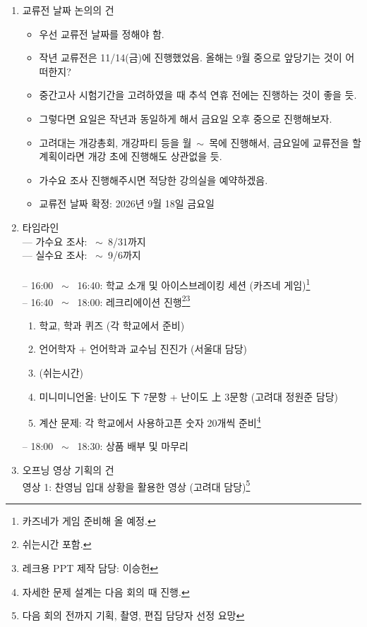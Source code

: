 \documentclass{oblivoir}
\begin{document}
\begin{enumerate}
    \item 교류전 날짜 논의의 건
    \begin{itemize}
        \item [승헌] 우선 교류전 날짜를 정해야 함.
        \item [찬영] 작년 교류전은 11/14(금)에 진행했었음. 올해는 9월 중으로 앞당기는 것이 어떠한지?
        \item [원준] 중간고사 시험기간을 고려하였을 때 추석 연휴 전에는 진행하는 것이 좋을 듯.
        \item [승헌] 그렇다면 요일은 작년과 동일하게 해서 금요일 오후 중으로 진행해보자. 
        \item [세찬] 고려대는 개강총회, 개강파티 등을 월~$\sim$~목에 진행해서, 금요일에 교류전을 할 계획이라면 개강 초에 진행해도 상관없을 듯.
        \item [승헌] 가수요 조사 진행해주시면 적당한 강의실을 예약하겠음.
        \item 교류전 날짜 확정: 2026년 9월 18일 금요일
    \end{itemize}
    \item 타임라인
    \\--- 가수요 조사: ~$\sim$~8/31까지
    \\--- 실수요 조사: ~$\sim$~9/6까지
    \\[교류전 타임라인]
    \\-- 16:00 ~$\sim$~ 16:40: 학교 소개 및 아이스브레이킹 세션 (카즈네 게임)\footnote{카즈네가 게임 준비해 올 예정.}
    \\-- 16:40 ~$\sim$~ 18:00: 레크리에이션 진행\footnote{쉬는시간 포함.}\footnote{레크용 PPT 제작 담당: 이승헌}
    \begin{enumerate}
        \item 학교, 학과 퀴즈 (각 학교에서 준비)
        \item 언어학자 + 언어학과 교수님 진진가 (서울대 담당)
        \item (쉬는시간)
        \item 미니미니언올: 난이도 下 7문항 + 난이도 上 3문항 (고려대 정원준 담당)
        \item 계산 문제: 각 학교에서 사용하고픈 숫자 20개씩 준비\footnote{자세한 문제 설계는 다음 회의 때 진행.}
    \end{enumerate}
    -- 18:00 ~$\sim$~ 18:30: 상품 배부 및 마무리
    \item 오프닝 영상 기획의 건
    \\영상 1: 찬영님 입대 상황을 활용한 영상 (고려대 담당)\footnote{다음 회의 전까지 기획, 촬영, 편집 담당자 선정 요망}

\end{enumerate}
\end{document}
